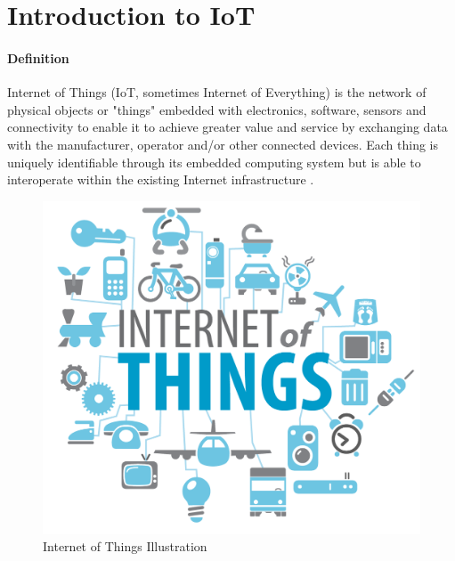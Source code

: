 \documentclass[12pt]{article}
\begin{document}
\maketitle

\section {Introduction to IoT}
\paragraph {Definition} Internet of Things (IoT, sometimes Internet of Everything) is the network of physical objects or "things" embedded with electronics, software, sensors and connectivity to enable it to achieve greater value and service by exchanging data with the manufacturer, operator and/or other connected devices. Each thing is uniquely identifiable through its embedded computing system but is able to interoperate within the existing Internet infrastructure \cite{wiki}.

\begin{figure}
\caption[width=50mm]{Internet of Things Illustration}
\includegraphics{iot.png}
\end{figure}
\end{document}
